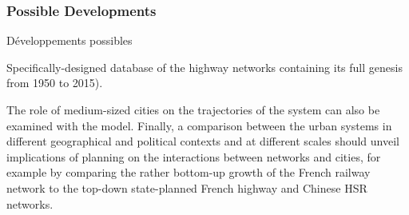 \subsubsection{Possible Developments}{Développements possibles}


Specifically-designed database of the highway networks containing its full genesis from 1950 to 2015).


The role of medium-sized cities on the trajectories of the system can also be examined with the model. Finally, a comparison between the urban systems in different geographical and political contexts and at different scales should unveil implications of planning on the interactions between networks and cities, for example by comparing the rather bottom-up growth of the French railway network to the top-down state-planned French highway and Chinese HSR networks.










